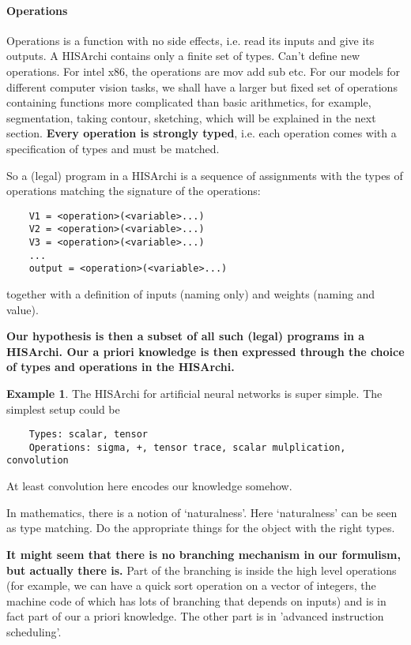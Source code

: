 \documentclass[10pt, oneside]{article}   	%
\theoremstyle{definition}
\newtheorem*{eg}{Example}
\begin{document}
\paragraph{Operations} Operations is a function with no side effects, i.e. read its inputs and give its outputs. A HISArchi contains only a finite set of types. Can't define new operations. For intel x86, the operations are mov add sub etc. For our models for different computer vision tasks, we shall have a larger but fixed set of operations containing functions more complicated than basic arithmetics, for example, segmentation, taking contour, sketching, which will be explained in the next section. \textbf{Every operation is strongly typed}, i.e. each operation comes with a specification of types and must be matched.

So a (legal) program in a HISArchi is a sequence of assignments with the types of operations matching the signature of the operations:
\begin{center}
\begin{verbatim}
	V1 = <operation>(<variable>...)
	V2 = <operation>(<variable>...)
	V3 = <operation>(<variable>...)
	...
	output = <operation>(<variable>...)
\end{verbatim}
\end{center}
together with a definition of inputs (naming only) and weights (naming and value).

\textbf{Our hypothesis is then a subset of all such (legal) programs in a HISArchi. Our a priori knowledge is then expressed through the choice of types and operations in the HISArchi.}
\begin{eg}
The HISArchi for artificial neural networks is super simple. The simplest setup could be
\begin{verbatim}
	Types: scalar, tensor
	Operations: sigma, +, tensor trace, scalar mulplication, convolution
\end{verbatim}
At least convolution here encodes our knowledge somehow.
\end{eg} 
\begin{rmk}
	In mathematics, there is a notion of `naturalness'. Here `naturalness' can be seen as type matching. Do the appropriate things for the object with the right types.
\end{rmk}

\textbf{It might seem that there is no branching mechanism in our formulism, but actually there is.} Part of the branching is inside the high level operations (for example, we can have a quick sort operation on a vector of integers, the machine code of which has lots of branching that depends on inputs) and is in fact part of our a priori knowledge. The other part is in 'advanced instruction scheduling'.
\end{document}
